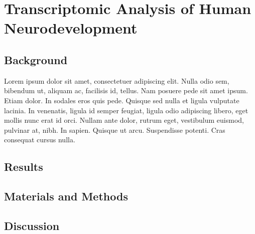 \chapter{Transcriptomic Analysis of Human Neurodevelopment}
\section{Background}
Lorem ipsum dolor sit amet, consectetuer adipiscing elit. Nulla odio
sem, bibendum ut, aliquam ac, facilisis id, tellus. Nam posuere pede
sit amet ipsum. Etiam dolor. In sodales eros quis pede.  Quisque sed
nulla et ligula vulputate lacinia. In venenatis, ligula id semper
feugiat, ligula odio adipiscing libero, eget mollis nunc erat id orci.
Nullam ante dolor, rutrum eget, vestibulum euismod, pulvinar at, nibh.
In sapien. Quisque ut arcu. Suspendisse potenti. Cras consequat cursus
nulla.
\section{Results}
\section{Materials and Methods}
\section{Discussion}